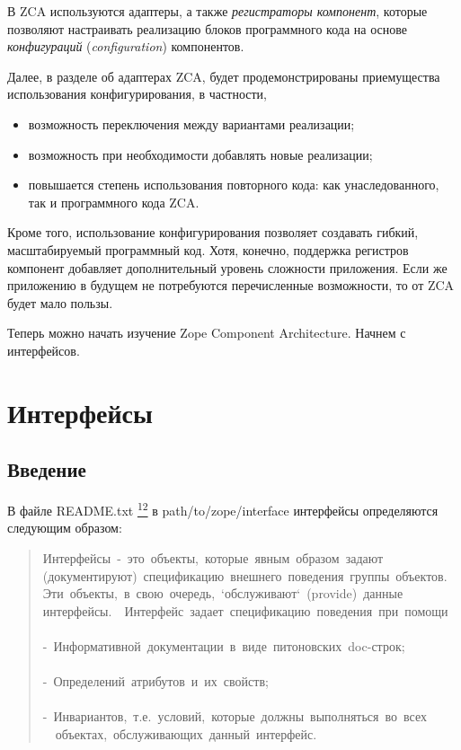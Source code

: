\documentclass[14pt,a4paper,openany,twoside,final]{extbook}
\providecommand*{\DUfootnotemark}[3]{%
  \raisebox{1em}{\hypertarget{#1}{}}%
  \hyperlink{#2}{\textsuperscript{#3}}%
}
\begin{document}
В ZCA используются адаптеры, а также \emph{регистраторы компонент}, которые
позволяют настраивать реализацию блоков программного кода на
основе \emph{конфигураций} (\emph{configuration}) компонентов.

Далее, в разделе об адаптерах ZCA, будет продемонстрированы
приемущества использования конфигурирования, в частности,

\begin{itemize}

\item возможность переключения между вариантами реализации;

\item возможность при необходимости добавлять новые реализации;

\item повышается степень использования повторного кода: как
унаследованного, так и программного кода ZCA.

\end{itemize}

Кроме того, использование конфигурирования позволяет создавать гибкий,
масштабируемый программный код.  Хотя, конечно, поддержка регистров
компонент добавляет дополнительный уровень сложности приложения.  Если
же приложению в будущем не потребуются перечисленные возможности, то
от ZCA будет мало пользы.

Теперь можно начать изучение Zope Component Architecture. Начнем с
интерфейсов.


\chapter{Интерфейсы%
  \label{id23}%
}


\section{Введение%
  \label{id24}%
}

В файле README.txt\DUfootnotemark{id25}{readmes}{12} в path/to/zope/interface интерфейсы
определяются следующим образом:

\begin{quote}{\ttfamily \raggedright \noindent
Интерфейсы~-~это~объекты,~которые~явным~образом~задают\\
(документируют)~спецификацию~внешнего~поведения~группы~объектов.\\
Эти~объекты,~в~свою~очередь,~`обслуживают`~(provide)~данные\\
интерфейсы.~~Интерфейс~задает~спецификацию~поведения~при~помощи\\
~\\
-~Информативной~документации~в~виде~питоновских~doc-строк;\\
~\\
-~Определений~атрибутов~и~их~свойств;\\
~\\
-~Инвариантов,~т.е.~условий,~которые~должны~выполняться~во~всех\\
~~объектах,~обслуживающих~данный~интерфейс.
}
\end{quote}
\end{document}
